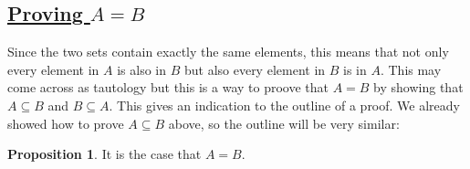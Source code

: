 \documentclass{amsart} %
\theoremstyle{definition} %
\theoremstyle{definition}
\newtheorem*{prpn}{Proposition}
\theoremstyle{remark} %
\begin{document}
\bigskip \bigskip

\subsection{\underline{Proving $A = B$}}\hspace*{\fill}

 Since the two sets contain exactly the same elements, this means that not only every element in $A$ is also in $B$ but also every element in $B$ is in $A$. This may come across as tautology but this is a way to proove that $A = B$ by showing that $A \subseteq B$ and $B \subseteq A$. This gives an indication to the outline of a proof. We already showed how to prove $A \subseteq B$ above, so the outline will be very similar:

\begin{prpn}
      It is the case that $A = B$.
\end{prpn}
\end{document}
